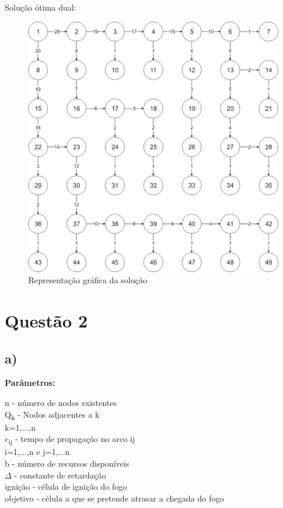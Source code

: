 \documentclass[11pt]{article} %
\begin{document}
Solução ótima dual:
	\begin{figure}[!htpb]
		\centering
    		\includegraphics[width=5in]{grafo1c.png}
    		\caption{Representação gráfica da solução}
	\end{figure}

\newpage

\section*{Questão 2}
\subsection*{a)}
\textbf{Parâmetros:}  \\
\begin{center}
n - número de nodos existentes \\
Q\textsubscript{k} - Nodos adjacentes a k \\
k=1,...,n \\
c\textsubscript{ij} - tempo de propagação no arco ij\\
i=1,...,n e j=1,...n \\
b - número de recursos disponíveis \\
$\Delta$ - constante de retardação \\
ignição - célula de ignição do fogo \\
objetivo - célula a que se pretende atrasar a chegada do fogo
\end{center}
\end{document}
